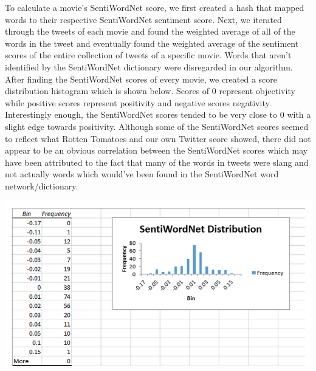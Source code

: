 \documentclass[12pt]{article}
\begin{document}
To calculate a movie’s SentiWordNet score, we first created a hash that mapped words to their respective SentiWordNet sentiment score. Next, we iterated through the tweets of each movie and found the weighted average of all of the words in the tweet and eventually found the weighted average of the sentiment scores of the entire collection of tweets of a specific movie. Words that aren’t identified by the SentiWordNet dictionary were disregarded in our algorithm. After finding the SentiWordNet scores of every movie, we created a score distribution histogram which is shown below. Scores of 0 represent objectivity while positive scores represent positivity and negative scores negativity. Interestingly enough, the SentiWordNet scores tended to be very close to 0 with a slight edge towards positivity. Although some of the SentiWordNet scores seemed to reflect what Rotten Tomatoes and our own Twitter score showed, there did not appear to be an obvious correlation between the SentiWordNet scores which may have been attributed to the fact that many of the words in tweets were slang and not actually words which would’ve been found in the SentiWordNet word network/dictionary.

\includegraphics[width=\textwidth]{sentiword}



\end{document}
